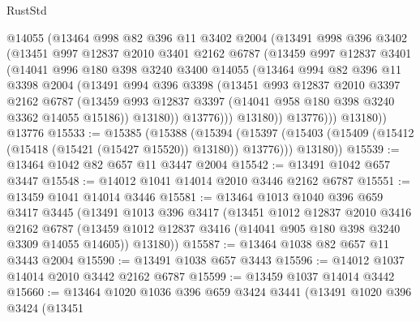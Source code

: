 \begin{lexlean}{RustStd}
\begin{coremodule}
{\begin{coremodule}
{{{{{{{{{{{{{{{{{{{{{{{{{{{{{{{            @14055
            (@13464
              @998
              @82
              @396
              @11
              @3402
              @2004
              (@13491
                @998
                @396
                @3402
                (@13451
                  @997
                  @12837
                  @2010
                  @3401
                  @2162
                  @6787
                  (@13459
                    @997
                    @12837
                    @3401
                    (@14041
                      @996
                      @180
                      @398
                      @3240
                      @3400
                      @14055
                      (@13464
                        @994
                        @82
                        @396
                        @11
                        @3398
                        @2004
                        (@13491
                          @994
                          @396
                          @3398
                          (@13451
                            @993
                            @12837
                            @2010
                            @3397
                            @2162
                            @6787
                            (@13459
                              @993
                              @12837
                              @3397
                              (@14041 @958 @180 @398 @3240 @3362 @14055 @15186))
                            @13180))
                        @13776)))
                  @13180))
              @13776)))
        @13180))
    @13776
@15533 := @15385
    (@15388
      (@15394
        (@15397 (@15403 (@15409 (@15412 (@15418 (@15421 (@15427 @15520)) @13180)) @13776)))
        @13180))
@15539 := @13464 @1042 @82 @657 @11 @3447 @2004
@15542 := @13491 @1042 @657 @3447
@15548 := @14012 @1041 @14014 @2010 @3446 @2162 @6787
@15551 := @13459 @1041 @14014 @3446
@15581 := @13464
    @1013
    @1040
    @396
    @659
    @3417
    @3445
    (@13491
      @1013
      @396
      @3417
      (@13451
        @1012
        @12837
        @2010
        @3416
        @2162
        @6787
        (@13459 @1012 @12837 @3416 (@14041 @905 @180 @398 @3240 @3309 @14055 @14605))
        @13180))
@15587 := @13464 @1038 @82 @657 @11 @3443 @2004
@15590 := @13491 @1038 @657 @3443
@15596 := @14012 @1037 @14014 @2010 @3442 @2162 @6787
@15599 := @13459 @1037 @14014 @3442
@15660 := @13464
    @1020
    @1036
    @396
    @659
    @3424
    @3441
    (@13491
      @1020
      @396
      @3424
      (@13451
}}}}}}}}}}}}}}}}}}}}}}}}}}}}}}}
\end{coremodule}}
\end{coremodule}
\end{lexlean}
